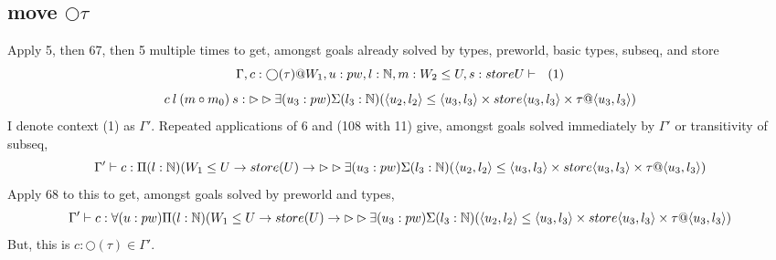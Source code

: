 \message{ !name(paper.tex)}\documentclass{article}
\begin{document}
\subsection*{move $\bigcirc \tau$}
Apply 5, then 67, then 5 multiple times to get, amongst goals already solved by types, preworld, basic types, subseq, and store
\[\Gamma, c: \bigcirc(\tau) @ W_1, u: pw, l: \mathbb{N}, m: W_2 \leq U, s: store U \vdash \:\:\: (1)\] \[ c \: l \: (m \circ m
    _0) \: s: \rhd \rhd \exists(u_3: pw)\Sigma(l_3: \mathbb{N})(\langle u_2, l_2 \rangle \leq \langle u_3, l_3 \rangle \times store\langle u_3, l_3 \rangle \times \tau @\langle u_3, l_3 \rangle)\]
    I denote context (1) as $\Gamma'$.
    Repeated applications of 6 and (108 with 11) give, amongst goals solved immediately by $\Gamma'$ or transitivity of subseq,
  \[\Gamma' \vdash c: \Pi(l: \mathbb{N})(W_1 \leq U \rightarrow store(U) \rightarrow  \rhd \rhd \exists(u_3: pw)\Sigma(l_3: \mathbb{N})(\langle u_2, l_2 \rangle \leq \langle u_3, l_3 \rangle \times store\langle u_3, l_3 \rangle \times \tau @\langle u_3, l_3 \rangle)\]
Apply 68 to this to get, amongst goals solved by preworld and types,
  \[\Gamma' \vdash c: \forall(u: pw)\Pi(l: \mathbb{N})(W_1 \leq U \rightarrow store(U) \rightarrow  \rhd \rhd \exists(u_3: pw)\Sigma(l_3: \mathbb{N})(\langle u_2, l_2 \rangle \leq \langle u_3, l_3 \rangle \times store\langle u_3, l_3 \rangle \times \tau @\langle u_3, l_3 \rangle)\]
  But, this is $c : \bigcirc(\tau) \in \Gamma'$.
  
\end{document}
